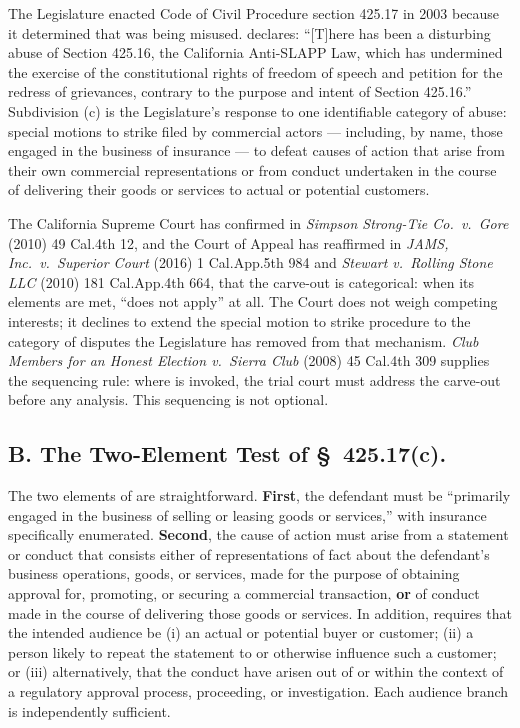 The Legislature enacted Code of Civil Procedure section 425.17 in 2003 because it determined that  was being misused.  declares: ``[T]here has been a disturbing abuse of Section 425.16, the California Anti-SLAPP Law, which has undermined the exercise of the constitutional rights of freedom of speech and petition for the redress of grievances, contrary to the purpose and intent of Section 425.16.'' Subdivision (c) is the Legislature's response to one identifiable category of abuse: special motions to strike filed by commercial actors --- including, by name, those engaged in the business of insurance --- to defeat causes of action that arise from their own commercial representations or from conduct undertaken in the course of delivering their goods or services to actual or potential customers.

The California Supreme Court has confirmed in \textit{Simpson Strong-Tie Co.\ v.\ Gore} (2010) 49 Cal.4th 12, and the Court of Appeal has reaffirmed in \textit{JAMS, Inc.\ v.\ Superior Court} (2016) 1 Cal.App.5th 984 and \textit{Stewart v.\ Rolling Stone LLC} (2010) 181 Cal.App.4th 664, that the carve-out is categorical: when its elements are met,  ``does not apply'' at all. The Court does not weigh competing interests; it declines to extend the special motion to strike procedure to the category of disputes the Legislature has removed from that mechanism. \textit{Club Members for an Honest Election v.\ Sierra Club} (2008) 45 Cal.4th 309 supplies the sequencing rule: where  is invoked, the trial court must address the carve-out before any  analysis. This sequencing is not optional.

\subsection*{B. The Two-Element Test of \S~425.17(c).}

The two elements of  are straightforward. \textbf{First}, the defendant must be ``primarily engaged in the business of selling or leasing goods or services,'' with insurance specifically enumerated. \textbf{Second}, the cause of action must arise from a statement or conduct that consists either of representations of fact about the defendant's business operations, goods, or services, made for the purpose of obtaining approval for, promoting, or securing a commercial transaction, \textbf{or} of conduct made in the course of delivering those goods or services. In addition,  requires that the intended audience be (i) an actual or potential buyer or customer; (ii) a person likely to repeat the statement to or otherwise influence such a customer; or (iii) alternatively, that the conduct have arisen out of or within the context of a regulatory approval process, proceeding, or investigation. Each audience branch is independently sufficient.

